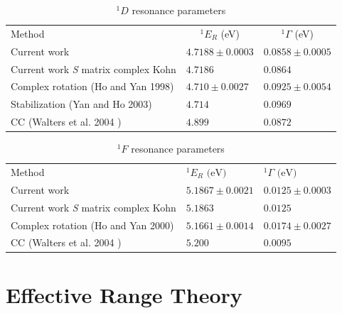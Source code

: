 \documentclass[preprint,showpacs,showkeys,preprintnumbers,amsmath,amssymb,longbibliography,pra,aps]{revtex4-1}
\newcommand*{\thead}[1]{\multicolumn{1}{c}{#1}}
\begin{document}
\begin{table}[H]
\begin{center}
\begin{ruledtabular}
\begin{tabular}{l l l}
Method & \thead{$^1E_R$ (eV)} & \thead{$^1\Gamma$ (eV)} \\
\colrule
Current work & $4.7188 \pm 0.0003$ & $0.0858 \pm 0.0005$ \\
Current work \emph{S} matrix complex Kohn & $4.7186$ & $0.0864$ \\
Complex rotation (Ho and Yan 1998) \cite{Ho1998} & $4.710 \pm 0.0027$ & $0.0925 \pm 0.0054$  \\
Stabilization (Yan and Ho 2003) \cite{Yan2003} & $4.714$ & $0.0969$ \\
CC (Walters et al. 2004 \cite{Walters2004}) & $4.899$ & $0.0872$ \\
\end{tabular}
\end{ruledtabular}
\caption{$^1D$ resonance parameters} %
\label{tab:DWaveResonances}
\end{center}
\end{table}


\begin{table}[H]
\begin{center}
\begin{ruledtabular}
\begin{tabular}{l l l}
Method & $^1E_R \text{ (eV)}$ & $^1\Gamma \text{ (eV)}$ \\
\colrule
Current work & $5.1867 \pm 0.0021$ & $0.0125 \pm 0.0003$ \\
Current work \emph{S} matrix complex Kohn & $5.1863$ & $0.0125$ \\
Complex rotation (Ho and Yan 2000) \cite{Ho2000} & $5.1661 \pm 0.0014$ & $0.0174 \pm 0.0027$  \\
CC (Walters et al. 2004 \cite{Walters2004}) & $5.200$ & $0.0095$ \\
\end{tabular}
\end{ruledtabular}
\caption{$^1F$ resonance parameters} %
\label{tab:FWaveResonances}
\end{center}
\end{table}



\section{Effective Range Theory}
\end{document}

